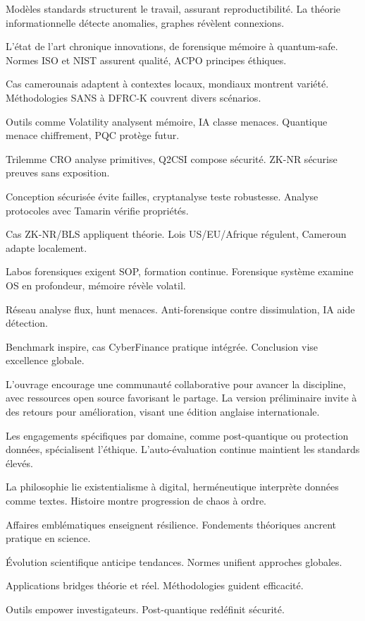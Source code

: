 \documentclass[a4paper,12pt]{extarticle}
\begin{document}
Modèles standards structurent le travail, assurant reproductibilité. La théorie informationnelle détecte anomalies, graphes révèlent connexions.

L'état de l'art chronique innovations, de forensique mémoire à quantum-safe. Normes ISO et NIST assurent qualité, ACPO principes éthiques.

Cas camerounais adaptent à contextes locaux, mondiaux montrent variété. Méthodologies SANS à DFRC-K couvrent divers scénarios.

Outils comme Volatility analysent mémoire, IA classe menaces. Quantique menace chiffrement, PQC protège futur.

Trilemme CRO analyse primitives, Q2CSI compose sécurité. ZK-NR sécurise preuves sans exposition.

Conception sécurisée évite failles, cryptanalyse teste robustesse. Analyse protocoles avec Tamarin vérifie propriétés.

Cas ZK-NR/BLS appliquent théorie. Lois US/EU/Afrique régulent, Cameroun adapte localement.

Labos forensiques exigent SOP, formation continue. Forensique système examine OS en profondeur, mémoire révèle volatil.

Réseau analyse flux, hunt menaces. Anti-forensique contre dissimulation, IA aide détection.

Benchmark inspire, cas CyberFinance pratique intégrée. Conclusion vise excellence globale.

L'ouvrage encourage une communauté collaborative pour avancer la discipline, avec ressources open source favorisant le partage. La version préliminaire invite à des retours pour amélioration, visant une édition anglaise internationale.

Les engagements spécifiques par domaine, comme post-quantique ou protection données, spécialisent l'éthique. L'auto-évaluation continue maintient les standards élevés.

La philosophie lie existentialisme à digital, herméneutique interprète données comme textes. Histoire montre progression de chaos à ordre.

Affaires emblématiques enseignent résilience. Fondements théoriques ancrent pratique en science.

Évolution scientifique anticipe tendances. Normes unifient approches globales.

Applications bridges théorie et réel. Méthodologies guident efficacité.

Outils empower investigateurs. Post-quantique redéfinit sécurité.
\end{document}
